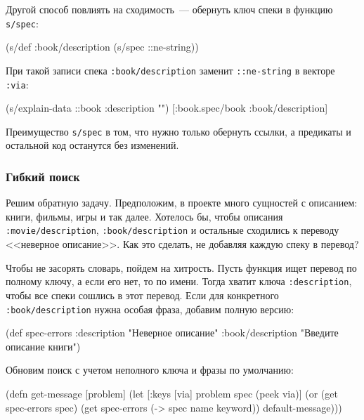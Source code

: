 Другой способ повлиять на сходимость~--- обернуть ключ спеки в функцию
\verb|s/spec|:

\begin{english}
  \begin{clojure}
(s/def :book/description (s/spec ::ne-string))
  \end{clojure}
\end{english}

При такой записи спека \verb|:book/description| заменит \verb|::ne-string| в
векторе \verb|:via|:

\begin{english}
  \begin{clojure}
(s/explain-data ::book {:description ""})
[:book.spec/book :book/description]
  \end{clojure}
\end{english}

Преимущество \verb|s/spec| в том, что нужно только обернуть ссылки, а
предикаты и остальной код останутся без изменений.

\subsubsection{Гибкий поиск}

Решим обратную задачу. Предположим, в проекте много сущностей с описанием:
книги, фильмы, игры и так далее. Хотелось бы, чтобы описания
\verb|:movie/description|, \verb|:book/description| и остальные сходились к
переводу <<неверное описание>>. Как это сделать, не добавляя каждую спеку в
перевод?

Чтобы не засорять словарь, пойдем на хитрость. Пусть функция ищет перевод по
полному ключу, а если его нет, то по имени. Тогда хватит ключа
\verb|:description|, чтобы все спеки сошлись в этот перевод. Если для
конкретного \verb|:book/description| нужна особая фраза, добавим полную
версию:

  \begin{clojure}
(def spec-errors
  {:description "Неверное описание"
   :book/description "Введите описание книги"})
  \end{clojure}

\noindent
Обновим поиск с учетом неполного ключа и фразы по умолчанию:

\begin{english}
  \begin{clojure}
(defn get-message
  [problem]
  (let [{:keys [via]} problem
        spec (peek via)]
    (or (get spec-errors spec)
        (get spec-errors (-> spec name keyword))
        default-message)))
  \end{clojure}
\end{english}

